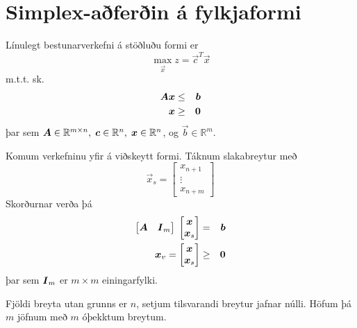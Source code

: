 \section{Simplex-aðferðin á fylkjaformi}
Línulegt bestunarverkefni á stöðluðu formi er 
$$\max_{\vec{x}} z=\vec{c}^T\vec{x}$$
m.t.t. sk.
\begin{eqnarray*}
 {\mbox{\boldmath$A$}}{\mbox{\boldmath$x$}}&\leq&{\mbox{\boldmath$b$}} \\ {\mbox{\boldmath$x$}}&\geq& {\mbox{\boldmath$0$}}
\end{eqnarray*}
þar sem ${\mbox{\boldmath$A$}}\in\mathbb{R}^{m\times n},\; {\mbox{\boldmath$c$}}\in\mathbb{R}^{n},\;{\mbox{\boldmath$x$}}\in\mathbb{R}^{n}$, og $\vec{b}\in\mathbb{R}^m$.

Komum verkefninu yfir á viðskeytt formi. Táknum slakabreytur með 
$$ \vec{x}_s = \begin{bmatrix}x_{n+1}\\ \vdots \\ x_{n+m} \end{bmatrix}$$
Skorðurnar verða þá
\begin{eqnarray*}
 \begin{bmatrix}{\mbox{\boldmath$A$}} & {\mbox{\boldmath$I$}}_m \end{bmatrix}\;\begin{bmatrix}{\mbox{\boldmath$x$}}\\{\mbox{\boldmath$x$}}_s \end{bmatrix}&=&{\mbox{\boldmath$b$}} \\
 {\mbox{\boldmath$x$}}_v=\begin{bmatrix}{\mbox{\boldmath$x$}}\\ {\mbox{\boldmath$x$}}_{s} \end{bmatrix}&\geq&{\mbox{\boldmath$0$}}
\end{eqnarray*}
þar sem ${\mbox{\boldmath$I$}}_m$ er $m\times m$ einingarfylki.

Fjöldi breyta utan grunns er $n$, setjum tilsvarandi breytur jafnar núlli. Höfum þá $m$ jöfnum með $m$ óþekktum breytum.

